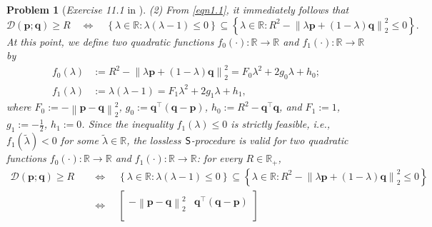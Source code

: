 \documentclass[11pt]{article}
\newtheorem{problem}{Problem}
\numberwithin{equation}{problem}
\begin{document}
\begin{problem} [\emph{Exercise 11.1} in \cite{calafiore2014optimization}]
{\indent (2) From \eqref{eqn1.1}, it immediately follows that
\begin{equation}
    \label{eqn1.2}
    \mathcal{D} \left( \mathbf{p}; \mathbf{q} \right) \geq R \quad \Leftrightarrow \quad 
    \left\{ \lambda \in \mathbb{R} : \lambda \left( \lambda - 1 \right) \leq 0 \right\} \subseteq 
    \left\{ \lambda \in \mathbb{R}: R^2 -
    \left\| \lambda \mathbf{p} + \left( 1 - \lambda \right) \mathbf{q} \right\|_{2}^2 \leq 0 \right\}.
\end{equation}
At this point, we define two quadratic functions $f_0 (\cdot) : \mathbb{R} \rightarrow \mathbb{R}$ and $f_1 (\cdot) : \mathbb{R} \rightarrow \mathbb{R}$ by
\begin{equation*}
    \begin{split}
        f_0 (\lambda) &:= R^2 -
        \left\| \lambda \mathbf{p} + \left( 1 - \lambda \right) \mathbf{q} \right\|_{2}^2
        = F_0 \lambda^2 + 2 g_0 \lambda + h_0; \\
        f_1 (\lambda) &:= \lambda \left( \lambda - 1 \right)
        = F_1 \lambda^2 + 2 g_1 \lambda + h_1,
    \end{split}
\end{equation*}
where $F_0 := - \left\| \mathbf{p} - \mathbf{q} \right\|_{2}^2$, $g_0 := \mathbf{q}^{\top} \left( \mathbf{q} - \mathbf{p} \right)$, $h_0 := R^2 - \mathbf{q}^{\top} \mathbf{q}$, and $F_1 := 1$, $g_1 := - \frac{1}{2}$, $h_1 := 0$. Since the inequality $f_1 (\lambda) \leq 0$ is strictly feasible, \emph{i.e.}, $f_1 \left( \tilde{\lambda} \right) < 0$ for some $\tilde{\lambda} \in \mathbb{R}$, the \emph{lossless $\textnormal{\textsf{S}}$-procedure} is valid for two quadratic functions $f_0 (\cdot) : \mathbb{R} \rightarrow \mathbb{R}$ and $f_1 (\cdot) : \mathbb{R} \rightarrow \mathbb{R}$: for every $R \in \mathbb{R}_{+}$,
\begin{equation}
    \label{eqn1.3}
    \begin{split}
        \mathcal{D} \left( \mathbf{p}; \mathbf{q} \right) \geq R \quad &\Leftrightarrow \quad 
        \left\{ \lambda \in \mathbb{R} : \lambda \left( \lambda - 1 \right) \leq 0 \right\} \subseteq 
        \left\{ \lambda \in \mathbb{R}: R^2 -
        \left\| \lambda \mathbf{p} + \left( 1 - \lambda \right) \mathbf{q} \right\|_{2}^2 \leq 0 \right\} \\
        &\Leftrightarrow \quad
        \begin{bmatrix}
            - \left\| \mathbf{p} - \mathbf{q} \right\|_{2}^2 & \mathbf{q}^{\top} \left( \mathbf{q} - \mathbf{p} \right) \\

\end{bmatrix}
\end{split}
\end{equation}}
\end{problem}
\end{document}
